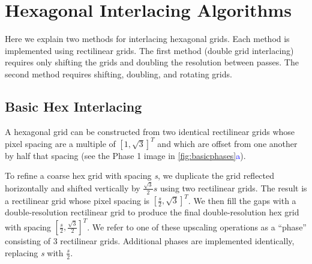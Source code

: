 \documentclass[aip, amsmath, amssymb, nobibnotes, nofootinbib, citeautoscript, reprint, superscriptaddress]{revtex4-2}
\newcommand*{\blu}{\textcolor{blue}}
\begin{document}
    \section{Hexagonal Interlacing Algorithms}
    \label{sec:hexinter}

    Here we explain two methods for interlacing hexagonal grids.
    Each method is implemented using rectilinear grids.
    The first method (double grid interlacing) requires only shifting the grids and doubling the resolution between passes.
    The second method requires shifting, doubling, and rotating grids.


    \subsection{\label{ssec:double-grid-interlacing}Basic Hex Interlacing}

    A hexagonal grid can be constructed from two identical rectilinear grids whose pixel spacing are a multiple of $\left[1, \sqrt{3}\right]^T$ and which are offset from one another by half that spacing (see the Phase 1 image in \autoref{fig:basicphases}\blu{a}).


    To refine a coarse hex grid with spacing \textit{s}, we duplicate the grid reflected horizontally and shifted vertically by $\frac{\sqrt{3}}{2}s$ using two rectilinear grids.
    The result is a rectilinear grid whose pixel spacing is $\left[\frac{s}{2}, \sqrt{3}\right]^T$.
    We then fill the gaps with a double-resolution rectilinear grid to produce the final double-resolution hex grid with spacing $\left[\frac{s}{2}, \frac{\sqrt{3}}{2}\right]^T$.
    We refer to one of these upscaling operations as a ``phase'' consisting of 3 rectilinear grids.
    Additional phases are implemented identically, replacing \textit{s} with $\frac{s}{2}$.
\end{document}

